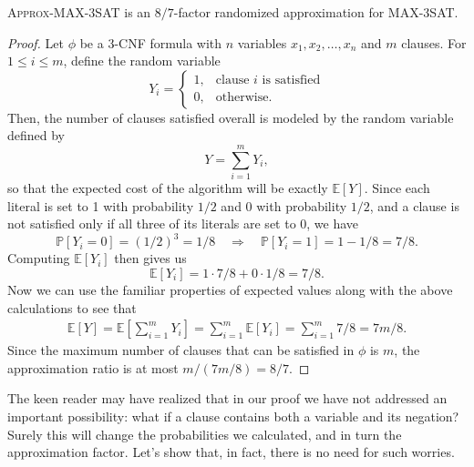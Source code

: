 \documentclass{article}
\newenvironment{theorem}[2][Theorem]{\begin{trivlist}
\item[\hskip \labelsep {\bfseries #1}\hskip \labelsep {\bfseries #2.}]}{\end{trivlist}}
\begin{document}
\begin{theorem}{4.1}{}
    \textsc{Approx-MAX-3SAT} is an $8/7$-factor randomized approximation for MAX-3SAT.

    \begin{proof}
        Let $\phi$ be a 3-CNF formula with $n$ variables $x_1,x_2,\dots,x_n$ and $m$ clauses. For $1 \leq i \leq m$, define the random variable
        \[
        Y_i =
        \begin{cases}
            1, &\text{clause $i$ is satisfied}\\
            0, &\text{otherwise}.
        \end{cases}
        \]
        Then, the number of clauses satisfied overall is modeled by the random variable defined by
        \[
        Y = \sum_{i=1}^m Y_i,
        \]
        so that the expected cost of the algorithm will be exactly $\mathbb{E}[Y]$. Since each literal is set to 1 with probability $1/2$ and 0 with probability $1/2$, and a clause is not satisfied only if all three of its literals are set to 0, we have
        \[
        \mathbb{P}[Y_i = 0] = (1/2)^3 = 1/8 \quad \Longrightarrow \quad \mathbb{P}[Y_i = 1] = 1 - 1/8 = 7/8.
        \]
        Computing $\mathbb{E}[Y_i]$ then gives us
        \[
        \mathbb{E}[Y_i] = 1 \cdot 7/8 + 0 \cdot 1/8 = 7/8.
        \]
        Now we can use the familiar properties of expected values along with the above calculations to see that
        \begin{align*}
            \mathbb{E}[Y] = \mathbb{E} \left[ \sum_{i=1}^m Y_i \right] = \sum_{i=1}^{m} \mathbb{E}[Y_i] = \sum_{i=1}^{m} 7/8 = 7m/8.
        \end{align*}
        Since the maximum number of clauses that can be satisfied in $\phi$ is $m$, the approximation ratio is at most $m/(7m/8) = 8/7$.
    \end{proof}
\end{theorem}

\noindent The keen reader may have realized that in our proof we have not addressed an important possibility: what if a clause contains both a variable and its negation? Surely this will change the probabilities we calculated, and in turn the approximation factor. Let's show that, in fact, there is no need for such worries. 

\end{document}
